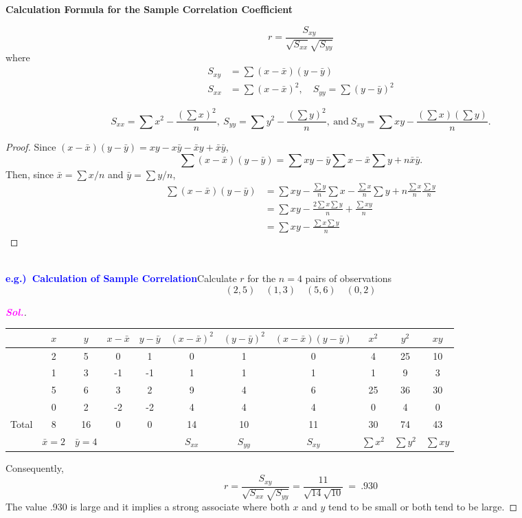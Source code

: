 \documentclass[12pt,a4paper]{article}
\newcommand{\sol}{\textcolor{magenta}{\bf \textit{Sol.}}\quad}
\newcommand{\eg}{\textcolor{blue}{\bf e.g.)\ }}
\newcommand{\mean}[1]{\bar{#1}}
\begin{document}
\begin{tcolorbox}[colback=white]\begin{center}
		\textbf{Calculation Formula for the Sample Correlation Coefficient}
	\end{center} \[
	r= \frac{S_{xy}}{\sqrt{S_{xx}}\sqrt{S_{yy}}}
	\] where \begin{align*}
		S_{xy} &= \sum(x-\mean{x})(y-\mean{y}) \\
		S_{xx} &= \sum(x-\mean{x})^2,\quad S_{yy}= \sum(y-\mean{y})^2
	\end{align*}
\end{tcolorbox}

\begin{tcolorbox}[colback=white]\[
		S_{xx} = \sum x^2 - \frac{(\sum x)^2}{n},\ S_{yy} = \sum y^2 - \frac{(\sum y)^2}{n},\ \text{and}\ S_{xy} = \sum xy - \frac{(\sum x)(\sum y)}{n}.
		\]\begin{proof} Since $(x-\mean{x})(y-\mean{y})=xy-x\mean{y}-\mean{x}y+\mean{x}\mean{y}$, \[
		\sum(x-\mean{x})(y-\mean{y})=\sum xy-\mean{y}\sum x-\mean{x}\sum y+n\mean{x}\mean{y}.
		\] Then, since $\mean{x}=\sum x/n$ and $\mean{y}=\sum y/n$, \begin{align*}
		\sum(x-\mean{x})(y-\mean{y})&=\sum xy-\frac{\sum y}{n}\sum x-\frac{\sum x}{n}\sum y+n\frac{\sum x}{n}\frac{\sum y}{n} \\
		&= \sum xy - \frac{2\sum x\sum y}{n} + \frac{\sum xy}{n} \\
		&=\sum xy - \frac{\sum x\sum y}{n}
		\end{align*}
	\end{proof}
\end{tcolorbox}\
\\
\eg\textcolor{blue}{\bf Calculation of Sample Correlation}\quad Calculate $r$ for the $n=4$ pairs of observations \[
(2,5)\quad(1,3)\quad(5,6)\quad(0,2) 
\] \begin{proof}[\sol]\
	\begin{center}
		\begin{tabular}{cccccccc||ccc}
		\toprule[1.2pt]
		& $x$ & $y$ & $x-\mean{x}$ & $y-\mean{y}$ & $(x-\mean{x})^2$ & $(y-\mean{y})^2$ & $(x-\mean{x})(y-\mean{y})$ & $x^2$ & $y^2$ & $xy$\\
		\hline
		& 2& 5& 0& 1& 0& 1& 0 & 4& 25& 10\\
		& 1& 3& -1& -1& 1& 1& 1 & 1& 9& 3\\
		& 5& 6& 3& 2& 9& 4& 6 & 25& 36& 30\\
		& 0& 2& -2& -2& 4& 4& 4 & 0& 4& 0\\
		\hline
		Total & 8& 16& 0& 0& 14& 10& 11 & 30& 74& 43\\
		& $\mean{x}=2$ & $\mean{y}=4$ & & & $S_{xx}$& $S_{yy}$& $S_{xy}$ & $\sum x^2$ & $\sum y^2$ & $\sum xy$\\
		\bottomrule[1.2pt]
	\end{tabular}
	\end{center} Consequently, \[
	r=\frac{S_{xy}}{\sqrt{S_{xx}}\sqrt{S_{yy}}}=\frac{11}{\sqrt{14}\sqrt{10}}\ =\ .930
\] The value .930 is large and it implies a strong associate where both $x$ and $y$ tend to be small or both tend to be large.
\end{proof}
\end{document}
